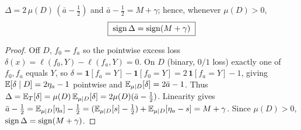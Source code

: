 \begin{lemma}[Reduction]\label{lem:reduction}
$\Delta = 2\,\mu(D)\,(\bar a-\tfrac12)$ and $\bar a-\tfrac12 = M+\gamma$; hence, whenever
$\mu(D)>0$,
\[
  \boxed{\;\operatorname{sign}\Delta=\operatorname{sign}(M+\gamma)\;}
\]
\end{lemma}
\begin{proof}
Off $D$, $f_0=f_a$ so the pointwise excess loss $\delta(x)=\ell(f_0,Y)-\ell(f_a,Y)=0$. On
$D$ (binary, $0/1$ loss) exactly one of $f_0,f_a$ equals $Y$, so
$\delta=\mathbf 1[f_a{=}Y]-\mathbf 1[f_0{=}Y]=2\,\mathbf 1[f_a{=}Y]-1$, giving
$\mathbb{E}[\delta\mid D]=2\eta_a-1$ pointwise and $\mathbb{E}_{\mu\mid D}[\delta]=2\bar a-1$. Thus
$\Delta=\mathbb{E}_T[\delta]=\mu(D)\,\mathbb{E}_{\mu\mid D}[\delta]=2\mu(D)(\bar a-\tfrac12)$. Linearity gives
$\bar a-\tfrac12=\mathbb{E}_{\mu\mid D}[\eta_a]-\tfrac12=(\mathbb{E}_{\mu\mid D}[s]-\tfrac12)+\mathbb{E}_{\mu\mid D}[\eta_a-s]=M+\gamma$.
Since $\mu(D)>0$, $\operatorname{sign}\Delta=\operatorname{sign}(M+\gamma)$.
\end{proof}

